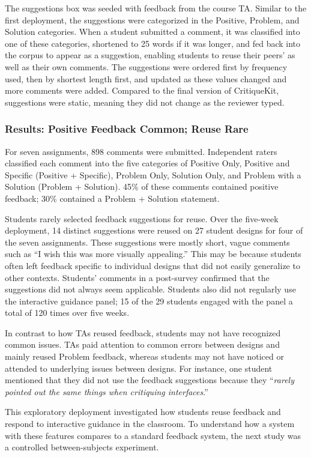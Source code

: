 The suggestions box was seeded with feedback from the course TA. Similar to the first deployment, the suggestions were categorized in the Positive, Problem, and Solution categories. When a student submitted a comment, it was classified into one of these categories, shortened to 25 words if it was longer, and fed back into the corpus to appear as a suggestion, enabling students to reuse their peers' as well as their own comments. The suggestions were ordered first by frequency used, then by shortest length first, and updated as these values changed and more comments were added. Compared to the final version of CritiqueKit, suggestions were static, meaning they did not change as the reviewer typed.

\subsubsection{Results: Positive Feedback Common; Reuse Rare}
For seven assignments, 898 comments were submitted. Independent raters classified each comment into the five categories of Positive Only, Positive  and  Specific (Positive + Specific), Problem Only, Solution Only, and Problem with a Solution (Problem + Solution). 45\% of these comments contained positive feedback; 30\% contained a Problem + Solution statement. 

Students rarely selected feedback suggestions for reuse. Over the five-week deployment, 14 distinct suggestions were reused on 27 student designs for four of the seven assignments. These suggestions were mostly short, vague comments such as ``I wish this was more visually appealing.'' This may be because students often left feedback specific to individual designs that did not easily generalize to other contexts. Students' comments in a post-survey confirmed that the suggestions did not always seem applicable. Students also did not regularly use the interactive guidance panel; 15 of the 29 students engaged with the panel a total of 120 times over five weeks. 

In contrast to how TAs reused feedback, students may not have recognized common issues. TAs paid attention to common errors between designs and mainly reused Problem feedback, whereas students may not have noticed or attended to underlying issues between designs. For instance, one student mentioned that they did not use the feedback suggestions because they ``\textit{rarely pointed out the same things when critiquing interfaces}.'' 

This exploratory deployment investigated how students reuse feedback and respond to interactive guidance in the classroom. To understand how a system with these features compares to a standard feedback system, the next study was a controlled between-subjects experiment. 
